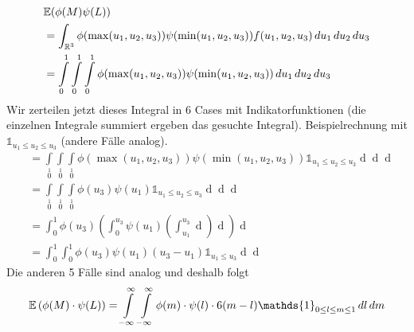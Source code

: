 \begin{align*}
	&\mathbb{E}(\phi(M)\psi(L)) \\
	&= \int_{\mathbb{R}^3} \phi(\max(u_1, u_2, u_3))\psi(\min(u_1, u_2, u_3)) f(u_1, u_2, u_3) \mathop{du_1}\mathop{du_2}\mathop{du_3}\\
	&= \int\limits_0\limits^1 \int\limits_0\limits^1 \int\limits_0\limits^1 \phi(\max(u_1, u_2, u_3))\psi(\min(u_1, u_2, u_3)) \mathop{du_1}\mathop{du_2}\mathop{du_3}
\end{align*}
Wir zerteilen jetzt dieses Integral in 6 Cases mit Indikatorfunktionen (die einzelnen Integrale summiert ergeben das gesuchte Integral). 
Beispielrechnung mit $\mathds{1}_{u_1 \leq u_2 \leq u_3}$ (andere Fälle analog).
\begin{align*}
	&= \int\limits_0\limits^1 \int\limits_0\limits^1 \int\limits_0\limits^1 \phi(\max(u_1, u_2, u_3))\psi(\min(u_1, u_2, u_3)) \mathds{1}_{u_1 \leq u_2 \leq u_3} \mathop{du_1}\mathop{du_2}\mathop{du_3}\\
	&= \int\limits_0\limits^1 \int\limits_0\limits^1 \int\limits_0\limits^1 \phi(u_3)\psi(u_1) \mathds{1}_{u_1 \leq u_2 \leq u_3} \mathop{du_1}\mathop{du_2}\mathop{du_3}\\
	&= \int_0^1 \phi(u_3) \left(\int_0^{u_3}\psi(u_1)\left(\int_{u_1}^{u_3}\mathop{du_2}\right)\mathop{du_1}\right)\mathop{du_3}\\
	&= \int_0^1\int_0^1 \phi(u_3)\psi(u_1)(u_3-u_1)\mathds{1}_{u_1\leq u_3}\mathop{du_1}\mathop{du_3}
\end{align*}
Die anderen 5 Fälle sind analog und deshalb folgt
\[\E\left(\phi(M)\cdot\psi(L)\right) = \int\limits_{-\infty}\limits^\infty \int\limits_{-\infty}\limits^\infty \phi(m) \cdot \psi(l) \cdot6(m-l)\mathds{1}_{0\leq l\leq m \leq 1}\mathop{dl}\mathop{dm}\]